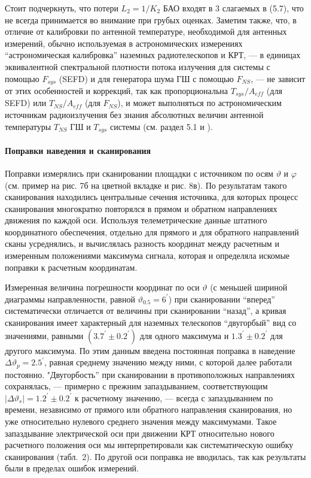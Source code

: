 Стоит подчеркнуть, что потери $L_2 = 1 / K_2$ БАО входят в 3 слагаемых в (5.7), что не всегда
принимается во внимание при грубых оценках. Заметим также, что, в отличие от калибровки по антенной
температуре, необходимой для антенных измерений, обычно используемая в астрономических измерениях
``астрономическая калибровка'' наземных радиотелескопов и КРТ, --- в единицах эквивалентной
спектральной плотности потока излучения для системы с помощью $F_{sys}$ (SEFD) и для генератора шума
ГШ  с помощью $F_{NS}$,   --- не зависит от этих особенностей и коррекций, так как пропорциональна
$T_{sys}/A_{eff}$ (для SEFD) или $T_{NS} / A_{eff}$ (для $F_{NS}$), и может выполняться по
астрономическим источникам радиоизлучения без знания абсолютных величин антенной температуры
$T_{NS}$ ГШ и $T_{sys}$ системы (см. раздел 5.1 и \cite{Kovalev_1999}).

\paragraph{Поправки наведения и сканирования}

Поправки измерялись при сканировании площадки с источником
по осям $\vartheta$ и $\varphi$ (см. пример на рис. 7б на цветной вкладке и рис. 8в).
По результатам такого сканирования находились центральные
сечения источника, для которых процесс сканирования многократно
повторялся в прямом и обратном направлениях движения по каждой оси.
Используя телеметрические данные штатного координатного обеспечения,
отдельно для прямого и для обратного направлений сканы
усреднялись, и вычислялась разность координат между расчетным и
измеренным положениями максимума сигнала, которая и определяла
искомые поправки к расчетным координатам.

Измеренная величина погрешности координат по оси $\vartheta$ (с меньшей шириной
диаграммы направленности, равной $\vartheta_{0.5} = 6^\prime$)
при сканировании ``вперед'' систематически отличается от величины
при сканировании ``назад'', а кривая сканирования имеет характерный для наземных
телескопов ``двугорбый'' вид  со значениями, равными $(3.7^\prime \pm 0.2^\prime)$
для одного максимума и $ 1.3^\prime \pm 0.2^\prime $    для другого максимума.
По этим данным введена постоянная поправка в наведение
$\Delta \vartheta_p = 2.5^\prime$,
равная среднему значению между ними, с которой далее  работали постоянно.
"Двугорбость'' при сканировании в противоположных направлениях сохранялась,
--- примерно с прежним запаздыванием, соответствующим
$\vert \Delta \vartheta_s \vert = 1.2^\prime \pm 0.2^\prime$ к расчетному значению, ---
всегда с запаздыванием по времени, независимо от прямого или обратного
направления сканирования, но уже относительно нулевого среднего значения
между максимумами. Такое запаздывание электрической оси при движении КРТ
относительно нового расчетного положения оси мы интерпретировали как
систематическую ошибку сканирования (табл.~2).
По другой оси поправка не вводилась, так как результаты
были в пределах ошибок измерений.

